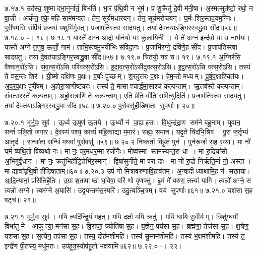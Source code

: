 ७.१७.१
उद॑स्य॒ शुष्माद्भा॒नुर्नार्त॒ बिभ॑र्ति। भा॒रं पृ॑थि॒वी न भूम॑। प्र शु॒क्रैतु॑ दे॒वी म॑नी॒षा। अ॒स्मत्सुत॑ष्टो॒ रथो॒ न वा॒जी। अर्च॑न्त॒ एके॒ महि॒ साम॑मन्वत। तेन॒ सूर्य॑मधारयन्। तेन॒ सूर्य॑मरोचयन्। घ॒र्मः  शिर॒स्तद॒यम॒ग्निः। पुरी॑षमसि॒ संप्रि॑यं प्र॒जया॑ प॒शुभि॑र्भुवत्। प्र॒जापति॑स्त्वा सादयतु। तया॑ दे॒वत॑याऽङ्गिर॒स्वद्ध्रु॒वा सी॑द॥५६॥
७.१८.०
-। १८।
\anuvakamend
७.१८.१
यास्ते॑ अग्न आ॒र्द्रा योन॑यो॒ याः कु॑ला॒यिनी। ये ते॑ अग्न॒ इन्द॑वो॒ या उ॒ नाभ॑यः। यास्ते॑ अग्ने त॒नुव॒ ऊर्जो॒ नाम॑। ताभि॒स्त्वमु॒भयी॑भिः संविदा॒नः। प्र॒जाभि॑रग्ने॒ द्रवि॑णे॒ह सी॑द। प्र॒जाप॑तिस्त्वा सादयतु। तया॑ दे॒वत॑याऽङ्गिर॒स्वद्ध्रु॒वा सी॑द॥५७॥
७.१९.०
चित॑यो॒ नव॑ च॥ १९।
\anuvakamend
७.१९.१
अ॒ग्निर॑सि वैश्वान॒रो॑ऽसि। सं॒व॒त्स॒रो॑ऽसि परिवत्स॒रो॑ऽसि। इ॒दा॒व॒त्स॒रो॑ऽसीदुवत्स॒रो॑ऽसि। इ॒द्व॒त्स॒रो॑ऽसि वत्स॒रो॑ऽसि। तस्य॑ ते वस॒न्तः  शिर॑। ग्री॒ष्मो दक्षि॑णः प॒क्षः। व॒र्\mbox{}षाः पुच्छम्। श॒रदुत्त॑रः प॒क्षः। हे॒म॒न्तो मध्यम्। पू॒र्व॒प॒क्षाश्चित॑यः। अ॒प॒र॒प॒क्षाः पुरी॑षम्। अ॒हो॒रा॒त्राणीष्ट॑काः। तस्य॑ ते॒ मासाश्चार्द्धमा॒साश्च॑ कल्पन्ताम्। ऋ॒तव॑स्ते कल्पन्ताम्। सं॒व॒त्स॒रस्ते॑ कल्पताम्। अ॒हो॒रा॒त्राणि॑ ते कल्पन्ताम्। एति॒ प्रेति॒ वीति॒ समित्युदिति॑। प्र॒जाप॑तिस्त्वा सादयतु। तया॑ दे॒वत॑याऽङ्गिर॒स्वद्ध्रु॒वा सी॑द॥५८॥
७.२०.०
पु॒रो॒वसु॑र्\mbox{}हीडिषाता सुप॒र्णाः॥ २०॥
\anuvakamend

७.२०.१
भूर्भुवः॒ सुव॑। ऊ॒र्ध्व ऊ॒षुण॑ ऊ॒तये। ऊ॒र्ध्वो न॑ पा॒ह्यह॑सः। वि॒धुन्द्र॑द्रा॒ण सम॑ने बहू॒नाम्। युवा॑न॒ सन्तं॑ पलि॒तो ज॑गार। दे॒वस्य॑ पश्य॒ काव्यं॑ महि॒त्वाद्या म॒मार॑। सह्यः॒ समा॑न। यदृ॒ते चि॑दभि॒श्रिष॑। पु॒रा ज॒र्तृभ्य॑ आ॒तृद॑। सन्धा॑ता स॒न्धिं म॒घवा॑ पुरो॒वसु॑॥५९॥
७.२०.२
निष्क॑र्ता॒ विह्रु॑तं॒ पुन॑। पुन॑रू॒र्जा स॒ह र॒य्या। मा नो॑ घर्म व्यथि॒तो वि॑व्यथो नः। मा नः॒ पर॒मध॑र॒म्मा रजो॑नैः। मोष्व॑स्मा स्तम॑स्यन्त॒रा धा। मा रु॒द्रिया॑सो अ॒भिगु॑र्वृ॒धान॑। मा नः॒ क्रतु॑भिर्\mbox{}हीडि॒तेभि॑र॒स्मान्। द्विषा॑सुनीते॒ मा परा॑ दाः। मा नो॑ रु॒द्रो निर्\mbox{}ऋ॑ति॒र्मा नो॒ अस्ता। मा द्यावा॑पृथि॒वी ही॑डिषाताम्॥६०॥
७.२०.३
उप॑ नो मित्रावरुणावि॒हाव॑तम्। अ॒न्वादीध्याथामि॒ह न॑ सखाया। आ॒दि॒त्यानां॒ प्रसि॑तिर्\mbox{}हे॒तिः। उ॒ग्रा श॒तापाष्ठा घ॒विषा॒ परि॑ णो वृणक्तु। इ॒मं मे॑ वरुण॒ तत्त्वा॑ यामि। त्वन्नो॑ अग्ने॒ स त्वन्नो॑ अग्ने। त्वम॑ग्ने अ॒यासि॑। उद्व॒यन्तम॑स॒स्परि॑। उदु॒त्यञ्चि॒त्रम्। वय॑ सुपर्णाः॥६१॥
७.२१.०
यश॑सा स॒ह षट्च॑॥ २१॥
\anuvakamend

७.२१.१
भूर्भुवः॒ सुव॑। मयि॒ त्यदि॑न्द्रि॒यं म॒हत्। मयि॒ दक्षो॒ मयि॒ क्रतु॑। मयि॑ धायि सु॒वीर्यम्। त्रिशु॑ग्घ॒र्मो विभा॑तु मे। आकूत्या॒ मन॑सा स॒ह। वि॒राजा॒ ज्योति॑षा स॒ह। य॒ज्ञेन॒ पय॑सा स॒ह। ब्रह्म॑णा॒ तेज॑सा स॒ह। क्ष॒त्रेण॒ यश॑सा स॒ह। स॒त्येन॒ तप॑सा स॒ह। तस्य॒ दोह॑मशीमहि। तस्य॑ सु॒म्नम॑शीमहि। तस्य॑ भ॒क्षम॑शीमहि। तस्य॑ त॒ इन्द्रे॑ण पी॒तस्य॒ मधु॑मतः। उप॑हूत॒स्योप॑हूतो भक्षयामि॥६२॥
७.२२.०
-। २२।
\anuvakamend


